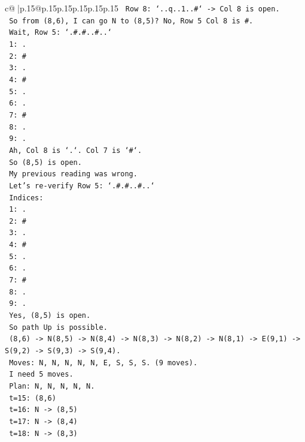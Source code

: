 \documentclass{article}
\begin{document}
{\begin{supertabular}{c@{$\;$}|p{.15\linewidth}@{}p{.15\linewidth}p{.15\linewidth}p{.15\linewidth}p{.15\linewidth}p{.15\linewidth}}
{{{\texttt{   Row 8: `..q..1..\#` {-}> Col 8 is open.} \\
\texttt{   So from (8,6), I can go N to (8,5)? No, Row 5 Col 8 is \#.} \\
\texttt{   Wait, Row 5: `.\#.\#..\#..`} \\
\texttt{   1: .} \\
\texttt{   2: \#} \\
\texttt{   3: .} \\
\texttt{   4: \#} \\
\texttt{   5: .} \\
\texttt{   6: .} \\
\texttt{   7: \#} \\
\texttt{   8: .} \\
\texttt{   9: .} \\
\texttt{   Ah, Col 8 is `.`. Col 7 is `\#`.} \\
\texttt{   So (8,5) is open.} \\
\texttt{   My previous reading was wrong.} \\
\texttt{   Let's re{-}verify Row 5: `.\#.\#..\#..`} \\
\texttt{   Indices:} \\
\texttt{   1: .} \\
\texttt{   2: \#} \\
\texttt{   3: .} \\
\texttt{   4: \#} \\
\texttt{   5: .} \\
\texttt{   6: .} \\
\texttt{   7: \#} \\
\texttt{   8: .} \\
\texttt{   9: .} \\
\texttt{   Yes, (8,5) is open.} \\
\texttt{   So path Up is possible.} \\
\texttt{   (8,6) {-}> N(8,5) {-}> N(8,4) {-}> N(8,3) {-}> N(8,2) {-}> N(8,1) {-}> E(9,1) {-}> S(9,2) {-}> S(9,3) {-}> S(9,4).} \\
\texttt{   Moves: N, N, N, N, N, E, S, S, S. (9 moves).} \\
\texttt{   I need 5 moves.} \\
\texttt{   Plan: N, N, N, N, N.} \\
\texttt{   t=15: (8,6)} \\
\texttt{   t=16: N {-}> (8,5)} \\
\texttt{   t=17: N {-}> (8,4)} \\
\texttt{   t=18: N {-}> (8,3)} \\
}}}
\end{supertabular}}
\end{document}
